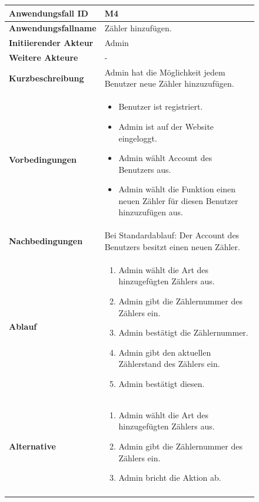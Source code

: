 \newpage

\begin{figure}[H]
	\centering
	\begin{tabularx}{\textwidth}{ X | X }

		\textbf{Anwendungsfall ID} & M4 \\ \hline
		\textbf{Anwendungsfallname} & Zähler hinzufügen. \\ \hline
		\textbf{Initiierender Akteur} & Admin \\ \hline
		\textbf{Weitere Akteure} & - \\ \hline
		\textbf{Kurzbeschreibung} & Admin hat die Möglichkeit jedem Benutzer neue Zähler hinzuzufügen.   \\ \hline
		\textbf{Vorbedingungen} & 
		\begin {itemize}
			\item Benutzer ist registriert. 
			\item Admin ist auf der Website eingeloggt.
			\item Admin wählt Account des Benutzers aus.
			\item Admin wählt die Funktion einen neuen Zähler für diesen Benutzer hinzuzufügen aus.
		\end{itemize}\\ \hline
		\textbf{Nachbedingungen} & Bei Standardablauf: Der Account des Benutzers besitzt einen neuen Zähler. \\ \hline
		\textbf{Ablauf} &
		\begin{enumerate}
			\item Admin wählt die Art des hinzugefügten Zählers aus.
			\item Admin gibt die Zählernummer des Zählers ein.
			\item Admin bestätigt die Zählernummer.
			\item Admin gibt den aktuellen Zählerstand des Zählers ein.
			\item Admin bestätigt diesen.
		\end{enumerate} \\ \hline
		\textbf{Alternative} & 
		\begin{enumerate}
			\item Admin wählt die Art des hinzugefügten Zählers aus.
			\item Admin gibt die Zählernummer des Zählers ein.
			\item Admin bricht die Aktion ab.
		\end{enumerate} \\ &
	\end{tabularx}
\end{figure}


